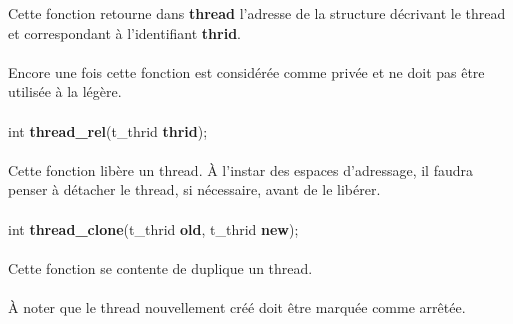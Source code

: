 \documentclass[10pt,a4wide]{article}
\begin{document}
Cette fonction retourne dans \textbf{thread} l'adresse de la structure
d\'ecrivant le thread et correspondant \`a l'identifiant \textbf{thrid}.

\paragraph{}

Encore une fois cette fonction est consid\'er\'ee comme priv\'ee et ne
doit pas \^etre utilis\'ee \`a la l\'eg\`ere.

\paragraph{}

\hspace{1.5cm}int \textbf{thread\_rel}(t\_thrid \textbf{thrid});

\paragraph{}

Cette fonction lib\`ere un thread. \`A l'instar des espaces d'adressage,
il faudra penser \`a d\'etacher le thread, si n\'ecessaire, avant de
le lib\'erer.

\paragraph{}

\hspace{1.5cm}int \textbf{thread\_clone}(t\_thrid \textbf{old},
                                         t\_thrid \textbf{new});

\paragraph{}

Cette fonction se contente de duplique un thread.

\paragraph{}

\`A noter que le thread nouvellement cr\'e\'e doit \^etre marqu\'ee comme
arr\^et\'ee.

\paragraph{}
\end{document}
